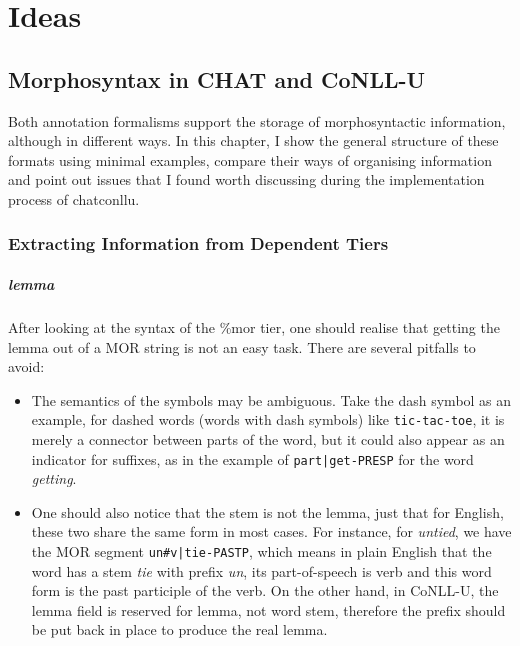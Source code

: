 \chapter{Ideas} %

\label{Chapter8} %

\section{Morphosyntax in CHAT and CoNLL-U}

Both annotation formalisms support the storage of morphosyntactic information, although in different ways. In this chapter, I show the general structure of these formats using minimal examples, compare their ways of organising information and point out issues that I found worth discussing during the implementation process of chatconllu.

\subsection{Extracting Information from Dependent Tiers}

\paragraph{lemma} After looking at the syntax of the \%mor tier, one should realise that getting the lemma out of a MOR string is not an easy task. There are several pitfalls to avoid:\\
\begin{itemize}
	\item The semantics of the symbols may be ambiguous. Take the dash symbol as an example, for dashed words (words with dash symbols) like \texttt{tic-tac-toe}, it is merely a connector between parts of the word, but it could also appear as an indicator for suffixes, as in the example of \texttt{part|get-PRESP} for the word \emph{getting}.
	\item One should also notice that the stem is not the lemma, just that for English, these two share the same form in most cases. For instance, for \emph{untied}, we have the MOR segment \texttt{un\#v|tie-PASTP}, which means in plain English that the word has a stem \emph{tie} with prefix \emph{un}, its part-of-speech is verb and this word form is the past participle of the verb. On the other hand, in CoNLL-U, the lemma field is reserved for lemma, not word stem, therefore the prefix should be put back in place to produce the real lemma.
\end{itemize}


